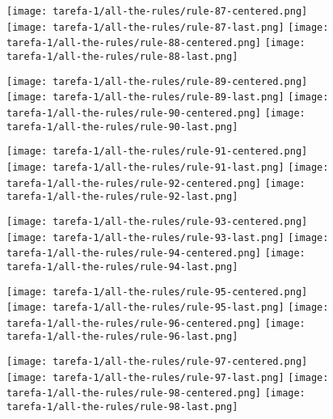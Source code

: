 \begin{figure}[htbp]
  \centering
\texttt{[image: tarefa-1/all-the-rules/rule-87-centered.png]}
\texttt{[image: tarefa-1/all-the-rules/rule-87-last.png]}
\texttt{[image: tarefa-1/all-the-rules/rule-88-centered.png]}
\texttt{[image: tarefa-1/all-the-rules/rule-88-last.png]}
\end{figure}
\begin{figure}[htbp]
  \centering
\texttt{[image: tarefa-1/all-the-rules/rule-89-centered.png]}
\texttt{[image: tarefa-1/all-the-rules/rule-89-last.png]}
\texttt{[image: tarefa-1/all-the-rules/rule-90-centered.png]}
\texttt{[image: tarefa-1/all-the-rules/rule-90-last.png]}
\end{figure}
\begin{figure}[htbp]
  \centering
\texttt{[image: tarefa-1/all-the-rules/rule-91-centered.png]}
\texttt{[image: tarefa-1/all-the-rules/rule-91-last.png]}
\texttt{[image: tarefa-1/all-the-rules/rule-92-centered.png]}
\texttt{[image: tarefa-1/all-the-rules/rule-92-last.png]}
\end{figure}
\begin{figure}[htbp]
  \centering
\texttt{[image: tarefa-1/all-the-rules/rule-93-centered.png]}
\texttt{[image: tarefa-1/all-the-rules/rule-93-last.png]}
\texttt{[image: tarefa-1/all-the-rules/rule-94-centered.png]}
\texttt{[image: tarefa-1/all-the-rules/rule-94-last.png]}
\end{figure}
\begin{figure}[htbp]
  \centering
\texttt{[image: tarefa-1/all-the-rules/rule-95-centered.png]}
\texttt{[image: tarefa-1/all-the-rules/rule-95-last.png]}
\texttt{[image: tarefa-1/all-the-rules/rule-96-centered.png]}
\texttt{[image: tarefa-1/all-the-rules/rule-96-last.png]}
\end{figure}
\begin{figure}[htbp]
  \centering
\texttt{[image: tarefa-1/all-the-rules/rule-97-centered.png]}
\texttt{[image: tarefa-1/all-the-rules/rule-97-last.png]}
\texttt{[image: tarefa-1/all-the-rules/rule-98-centered.png]}
\texttt{[image: tarefa-1/all-the-rules/rule-98-last.png]}
\end{figure}

